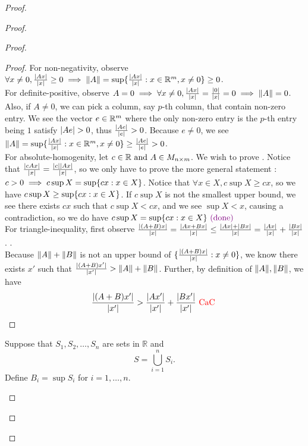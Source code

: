 \documentclass{report}
\begin{document}
\begin{proof}
\begin{proof}
\begin{proof}
\begin{proof}
For non-negativity, observe $\forall x\neq 0,\frac{|Ax|}{|x|}\geq 0 \implies \| A \|=\sup \{ \frac{|Ax|}{|x|}:x \in \mathbb{R}^m, x\neq 0 \}\geq 0$.\\

For definite-positive, observe $A=0\implies \forall x\neq 0, \frac{|Ax|}{|x|}=\frac{|0|}{|x|}=0\implies \| A \|=0$. Also, if $A\neq 0$, we can pick a column, say $p$-th column, that contain non-zero entry. We see the vector $e\in \mathbb{R}^m$ where the only non-zero entry is the  $p$-th entry being $1$ satisfy $\abso{Ae}>0$, thus $\frac{|Ae|}{|e|}>0$. Because $e\neq 0$, we see $\| A \|=\sup \{ \frac{|Ax|}{|x|}:x\in\mathbb{R}^m,x\neq 0 \}\geq \frac{|Ae|}{|e|}>0$.\\

For absolute-homogenity, let $c \in \mathbb{R}\text{ and }A\in M_{n\times m}$. We wish to prove . Notice that $\frac{|cAx|}{|x|}=\frac{|c||Ax|}{|x|}$, so we only have to prove the more general statement : $c>0 \implies c \sup X= \sup \{ cx:x\in X \}$. Notice that $\forall x \in X, c \sup X\geq cx$, so we have $c\sup X\geq \sup \{ cx:x\in X \}$. If $c\sup X$ is not the smallest upper bound, we see there exists $cx$ such that $c\sup X<cx$, and we see $\sup X<x$, causing a contradiction, so we do have $c\sup X=\sup \{ cx:x\in X \}\textcolor{violet}{\text{ (done) }}$   \\

For triangle-inequality, first observe $\frac{|(A+B)x|}{|x|}=\frac{|Ax+Bx|}{|x|}\leq \frac{|Ax|+|Bx|}{|x|}=\frac{|Ax|}{|x|}+\frac{|Bx|}{|x|}$. .\\

Because $\| A \|+\| B \|$ is not an upper bound of $\{ \frac{|(A+B)x|}{|x|}:x\neq 0 \}$, we know there exists $x'$ such that  $\frac{|(A+B)x'|}{|x'|}>\| A \|+\| B \|$. Further, by definition of $\| A \|,\| B \|$, we have
\begin{equation}
\frac{|(A+B)x'|}{|x'|}>\frac{|Ax'|}{|x'|}+\frac{|Bx'|}{|x'|}\text{ \textcolor{red}{CaC} }
\end{equation}
\end{proof}

\begin{question}{}{}
Suppose that \(S_1, S_2, \ldots, S_n\) are sets in \(\mathbb{R}\) and 
\[ S = \bigcup_{i=1}^{n} S_i. \]
Define \(B_i = \sup S_i\) for \(i = 1, \ldots, n\).


\end{question}
\end{proof}
\end{proof}
\end{proof}
\end{document}

